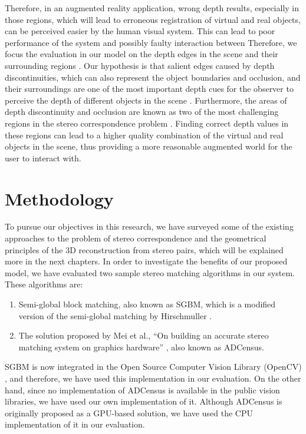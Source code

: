 Therefore, in an augmented reality application, wrong depth results, especially in those regions, 
which will lead to erroneous registration of virtual and real objects, 
can be perceived easier by the human visual system. This can lead to poor performance of the system and possibly faulty interaction between 
Therefore, we focus the evaluation in our model
on the depth edges in the scene and their surrounding regions \cite{liv05,kru10}.
Our hypothesis is that salient edges caused by depth discontinuities, which can also represent the object boundaries and occlusion, and their surroundings
are one of the most important depth cues for the observer 
to perceive the depth of different objects in the scene \cite{sze11}. 
Furthermore, the areas of depth discontinuity and occlusion are known as two of the most challenging regions 
in the stereo correspondence problem \cite{sch02}.
Finding correct depth values in these 
regions can lead to a higher quality combination of the virtual and real objects in the scene, thus providing a more reasonable augmented world 
for the user to interact with.


\section{Methodology}
To pursue our objectives in this research, we have surveyed some of the existing approaches to the problem 
of stereo correspondence and the geometrical principles of the 3D reconstruction from stereo pairs, which will be explained more 
in the next chapters. 
In order to investigate the benefits of our proposed model, we have evaluated two sample stereo matching algorithms in our system. 
These algorithms are:
\begin{enumerate}
\item Semi-global block matching, also known as SGBM, which is a modified version of the semi-global matching by Hirschmuller \cite{hir08}.
\item The solution  proposed by Mei et al., ``On building an accurate stereo matching system on graphics hardware'' \cite{mei11}, also known as ADCensus.
\end{enumerate}

SGBM is now integrated in the Open Source Computer Vision Library (OpenCV) \cite{sgbm}, and therefore, we have used this implementation
in our evaluation.
On the other hand, since no implementation of ADCensus is available in the public vision libraries, we have used our own implementation of it.
Although ADCensus is originally proposed as a GPU-based solution, we have used the CPU implementation of it in our evaluation.

